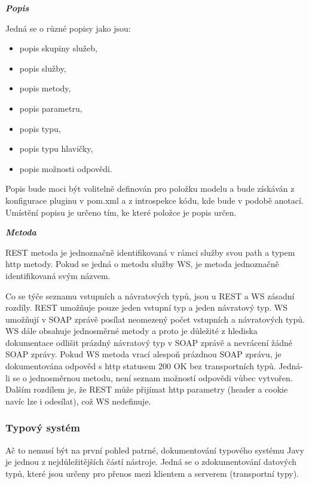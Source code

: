 \documentclass[11pt,twoside,a4paper]{book}
\begin{document}
\textbf{\textit{Popis}}

Jedná se o různé popisy jako jsou:

\begin{itemize}
  \item popis skupiny služeb,
  
  \item popis služby,
  
  \item popis metody,
  
  \item popis parametru,
  
  \item popis typu,
  
  \item popis typu hlavičky,
  
  \item popis možnosti odpovědi.
\end{itemize}

Popis bude moci být volitelně definován pro položku modelu a bude získáván z konfigurace
pluginu v pom.xml a z introspekce kódu, kde bude v podobě anotací. Umístění popisu je
určeno tím, ke které položce je popis určen.

\textbf{\textit{Metoda}}

REST metoda je jednoznačně identifikovaná v rámci služby svou path a typem http metody.
Pokud se jedná o metodu služby WS, je metoda jednoznačně identifikovaná svým názvem.

Co se týče seznamu vstupních a návratových typů, jsou u REST a WS zásadní rozdíly. REST
umožňuje pouze jeden vstupní typ a jeden návratový typ. WS umožňují v SOAP zprávě
posílat neomezený počet vstupních a návratových typů. WS dále obsahuje jednosměrné
metody a proto je důležité z hlediska dokumentace odlišit prázdný návratový typ v SOAP
zprávě a nevrácení žádné SOAP zprávy. Pokud WS metoda vrací alespoň prázdnou SOAP
zprávu, je dokumentována odpověd s http statusem 200 OK bez transportních typů. Jedná-li
se o jednosměrnou metodu, není seznam možností odpovědi vůbec vytvořen. Dalším rozdílem
je, že REST může přijímat http parametry (header a cookie navíc lze i odesílat), což WS
nedefinuje.

\subsubsection{Typový systém}
\label{subsec:typovy-system}

Ač to nemusí být na první pohled patrné, dokumentování typového systému Javy je jednou z
nejdůležitějších částí nástroje. Jedná se o zdokumentování datových typů, které jsou určeny
pro přenos mezi klientem a serverem (transportní typy).
\end{document}
